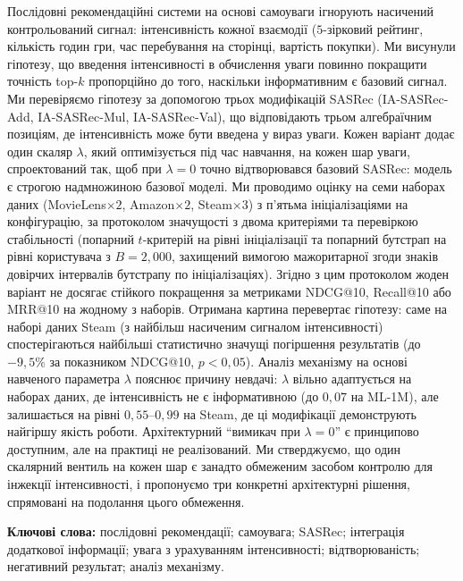 \begin{uabstract}
{\small\noindent Послідовні рекомендаційні системи на основі самоуваги ігнорують
насичений контрольований сигнал: інтенсивність кожної взаємодії
($5$-зірковий рейтинг, кількість годин гри, час перебування на
сторінці, вартість покупки). Ми висунули гіпотезу, що введення
інтенсивності в обчислення уваги повинно покращити точність top-$k$
пропорційно до того, наскільки інформативним є базовий сигнал. Ми
перевіряємо гіпотезу за допомогою трьох модифікацій SASRec
(IA-SASRec-Add, IA-SASRec-Mul, IA-SASRec-Val), що відповідають
трьом алгебраїчним позиціям, де інтенсивність може бути введена у
вираз уваги. Кожен варіант додає один скаляр $\lambda$, який
оптимізується під час навчання, на кожен шар уваги, спроектований
так, щоб при $\lambda{=}0$ точно відтворювався базовий SASRec:
модель є строгою надмножиною базової моделі. Ми проводимо оцінку на
семи наборах даних (MovieLens$\times2$, Amazon$\times2$,
Steam$\times3$) з п'ятьма ініціалізаціями на конфігурацію, за
протоколом значущості з двома критеріями та перевіркою стабільності
(попарний $t$-критерій на рівні ініціалізації та попарний бутстрап
на рівні користувача з $B{=}2{,}000$, захищений вимогою
мажоритарної згоди знаків довірчих інтервалів бутстрапу по
ініціалізаціях). Згідно з цим протоколом жоден варіант не досягає
стійкого покращення за метриками NDCG@10, Recall@10 або MRR@10 на
жодному з наборів. Отримана картина перевертає гіпотезу: саме на
наборі даних Steam (з найбільш насиченим сигналом інтенсивності)
спостерігаються найбільші статистично значущі погіршення результатів
(до $-9{,}5\%$ за показником NDCG@10, $p<0{,}05$). Аналіз механізму
на основі навченого параметра $\lambda$ пояснює причину невдачі:
$\lambda$ вільно адаптується на наборах даних, де інтенсивність не є
інформативною (до $0{,}07$ на ML-1M), але залишається на рівні
$0{,}55$--$0{,}99$ на Steam, де ці модифікації демонструють найгіршу
якість роботи. Архітектурний ``вимикач при $\lambda{=}0$'' є
принципово доступним, але на практиці не реалізований. Ми
стверджуємо, що один скалярний вентиль на кожен шар є занадто
обмеженим засобом контролю для інжекції інтенсивності, і пропонуємо
три конкретні архітектурні рішення, спрямовані на подолання цього
обмеження.

\par\smallskip
\noindent\textbf{Ключові слова:} послідовні рекомендації;
самоувага; SASRec; інтеграція додаткової інформації; увага з
урахуванням інтенсивності; відтворюваність; негативний результат;
аналіз механізму.}
\end{uabstract}
